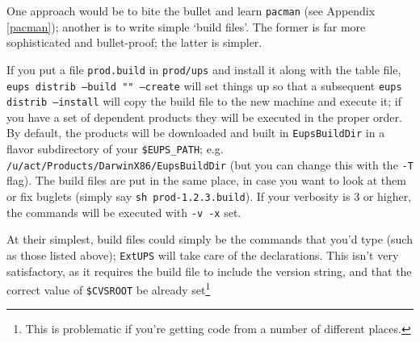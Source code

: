 \documentclass{article}
\newcommand{\code}[1]{\texttt{#1}}
\newcommand{\eups}{\code{ExtUPS}}
\newcommand{\pacman}{\code{pacman}}
\begin{document}
One approach would be to bite the bullet and learn \pacman{} (see Appendix \ref{pacman});
another is to write simple `build files'.  The former is far more sophisticated
and bullet-proof; the latter is simpler.

If you put a file \code{prod.build} in \code{prod/ups} and install it along
with the table file, \code{eups distrib --build "" --create} will set things up
so that a subsequent \code{eups distrib --install} will copy the build file
to the new machine and execute it;  if you have a set of dependent products
they will be executed in the proper order.  By default, the products will be downloaded
and built in \code{EupsBuildDir} in a flavor subdirectory of your \code{\$EUPS\_PATH};
e.g. \code{/u/act/Products/DarwinX86/EupsBuildDir} (but you can change this with
the \code{-T} flag). The build files are put in the same place, in case you want
to look at them or fix buglets (simply say \code{sh prod-1.2.3.build}).  If your
verbosity is 3 or higher, the commands will be executed with \code{-v -x} set.

At their simplest, build files could simply
be the commands that you'd type (such as those listed above); \eups{} will take
care of the declarations.  This isn't very satisfactory, as it requires the
build file to include the version string, and that the correct value of \code{\$CVSROOT}
be already set\footnote{This is problematic if you're getting code from a number
  of different places.}
\end{document}
